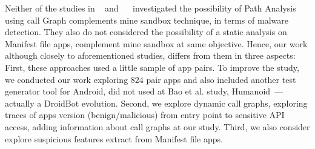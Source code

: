 Neither of the studies in ~\cite{DBLP:conf/icse/JamrozikSZ16} and ~\cite{DBLP:conf/wcre/BaoLL18}~\cite{le2018towards} investigated the possibility of Path Analysis using call Graph complements mine sandbox technique, in terms of malware detection. They also do not considered the possibility of a static analysis on Manifest file apps, complement mine sandbox at same objective. Hence, our work although closely to aforementioned studies, differs from them in three aspects: First, these approaches used a little sample of app pairs. To improve the study, we conducted our work exploring $824$ pair apps and also included another test generator tool for Android, did not used at Bao et al. study, Humanoid~\cite{DBLP:conf/kbse/LiY0C19}---actually a DroidBot evolution. Second, we explore dynamic call graphs, exploring traces of apps version (benign/malicious) from entry point to sensitive API access, adding information about call graphs at our study. Third, we also consider explore suspicious features extract from Manifest file apps.